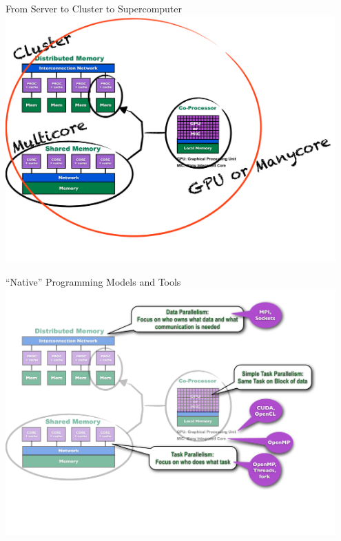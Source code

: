 \begin{frame}
\begin{block}{From Server to Cluster to Supercomputer}
    \includegraphics[width=0.95\textwidth]{pics/ParallelHardware5.pdf}
\end{block}
\end{frame}

\begin{frame}
\begin{block}{``Native'' Programming Models and Tools}
    \includegraphics[width=0.95\textwidth]{pics/ParallelHardware6.pdf}
\end{block}
\end{frame}

